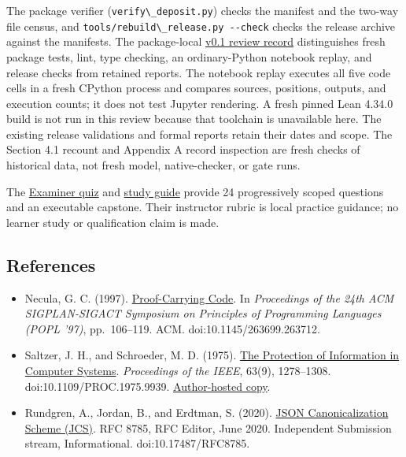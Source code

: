 \documentclass[
  11pt,
]{article}
\newcommand{\passthrough}[1]{#1}
\providecommand{\tightlist}{%
  \setlength{\itemsep}{0pt}\setlength{\parskip}{0pt}}
\begin{document}
The package verifier (\passthrough{\lstinline!verify\_deposit.py!})
checks the manifest and the two-way file census, and
\passthrough{\lstinline!tools/rebuild\_release.py --check!} checks the
release archive against the manifests. The package-local
\href{docs/v01_review_2026_10_02.json}{v0.1 review record} distinguishes
fresh package tests, lint, type checking, an ordinary-Python notebook
replay, and release checks from retained reports. The notebook replay
executes all five code cells in a fresh CPython process and compares
sources, positions, outputs, and execution counts; it does not test
Jupyter rendering. A fresh pinned Lean 4.34.0 build is not run in this
review because that toolchain is unavailable here. The existing release
validations and formal reports retain their dates and scope. The Section
4.1 recount and Appendix A record inspection are fresh checks of
historical data, not fresh model, native-checker, or gate runs.

The \href{_lev_examiner_theoretical_minimum_quiz/quiz.md}{Examiner quiz} and
\href{_lev_examiner_theoretical_minimum_quiz/study_guide.md}{study guide}
provide 24 progressively scoped questions and an executable capstone.
Their instructor rubric is local practice guidance; no learner study or
qualification claim is made.

\hypertarget{references}{%
\subsection{References}\label{references}}

\begin{itemize}
\tightlist
\item
  Necula, G. C. (1997).
  \href{https://doi.org/10.1145/263699.263712}{Proof-Carrying Code}. In
  \emph{Proceedings of the 24th ACM SIGPLAN-SIGACT Symposium on
  Principles of Programming Languages (POPL '97)}, pp.~106--119. ACM.
  doi:10.1145/263699.263712.
\item
  Saltzer, J. H., and Schroeder, M. D. (1975).
  \href{https://doi.org/10.1109/PROC.1975.9939}{The Protection of
  Information in Computer Systems}. \emph{Proceedings of the IEEE},
  63(9), 1278--1308. doi:10.1109/PROC.1975.9939.
  \href{https://web.mit.edu/Saltzer/www/publications/protection/}{Author-hosted
  copy}.
\item
  Rundgren, A., Jordan, B., and Erdtman, S. (2020).
  \href{https://www.rfc-editor.org/rfc/rfc8785}{JSON Canonicalization
  Scheme (JCS)}. RFC 8785, RFC Editor, June 2020. Independent Submission
  stream, Informational. doi:10.17487/RFC8785.
\end{itemize}
\end{document}
